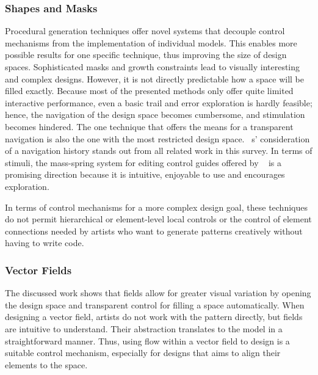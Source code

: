 \subsubsection{Shapes and Masks}
\label{subsubsec:analysis_creative_means_shapes}

Procedural generation techniques offer novel systems that decouple control mechanisms from the implementation of individual models. This enables more possible results for one specific technique, thus improving the size of design spaces. 
Sophisticated masks and growth constraints lead to visually interesting and complex designs. However, it is not directly predictable how a space will be filled exactly. Because most of the presented methods only offer quite limited interactive performance, even  a basic trail and error exploration is hardly feasible; hence, the navigation of the design space becomes cumbersome, and stimulation becomes hindered. The one technique \cite{santoni_2016_ggp} that offers the means for a transparent navigation is also the one with the most restricted design space. \citeauthor*{santoni_2016_ggp}~\cite{santoni_2016_ggp}s' consideration of a navigation history stands out from all related work in this survey. In terms of stimuli, the mass-spring system for editing control guides offered by \citeauthor*{benes_2011_gpm}~\cite{benes_2011_gpm} is a promising direction because it is intuitive, enjoyable to use and encourages exploration.

In terms of control mechanisms for a more complex design goal, these techniques do not permit hierarchical or element-level local controls or the control of element connections needed by artists who want to generate patterns creatively without having to write code.


\subsubsection{Vector Fields}
\label{subsubsec:analysis_creative_means_fields}

The discussed work 
shows that fields allow for greater visual variation by opening the design space and transparent control for filling a space automatically. When designing a vector field, artists do not work with the pattern directly, but fields are intuitive to understand. Their abstraction translates to the model in a straightforward manner. Thus, using flow within a vector field to design is a suitable control mechanism, especially for designs that aims to align their elements to the space.

